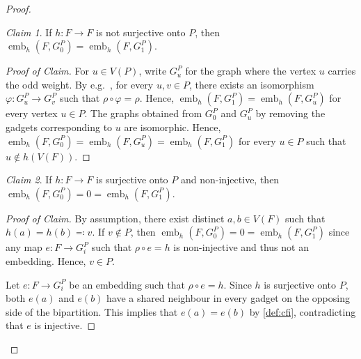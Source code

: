 \documentclass[11pt, DIV=15]{scrarticle}
\theoremstyle{definition}
\theoremstyle{plain}
\theoremstyle{remark}
\newtheorem{claim}{Claim}[definition]
\newenvironment{claimproof}[1][Proof of Claim]{\begin{proof}[#1] \renewcommand{\qedsymbol}{$\lrcorner$}}{ \end{proof}}
\DeclareMathOperator{\emb}{emb}
\renewcommand{\phi}{\varphi}
\begin{document}
\begin{proof}
		\begin{claim}\label{cl:knn1}
			If $h \colon F\to F$ is not surjective onto $P$,
			then $\emb_h(F, G_0^P) = \emb_h(F, G_1^P)$.
		\end{claim}
		\begin{claimproof}
			For $u \in V(P)$, write $G_u^P$ for the  graph where the vertex $u$ carries the odd weight.
			By e.g.\ \cite[Lemma~11]{neuen_homomorphism-distinguishing_2024}, for every $u, v \in P$, there exists an isomorphism $\phi \colon G_u^P \to G_v^P$ such that $\rho \circ \phi = \rho$.
			Hence, $\emb_h(F, G_1^P) = \emb_h(F, G_u^P)$ for every vertex $u \in P$.
			The graphs obtained from $G_0^P$ and $G_u^P$ by removing the gadgets corresponding to $u$ are isomorphic.
			Hence,
			$\emb_h(F, G_0^P) = \emb_h(F, G_u^P) = \emb_h(F, G_1^P)$ for every $u \in P$ such that $u \not\in h(V(F))$.
		\end{claimproof}
		
		\begin{claim}\label{cl:knn2}
			If $h \colon F \to F$ is surjective onto $P$
			and non-injective,
			then $\emb_h(F, G^P_0) = 0 = \emb_h(F, G^P_1)$.
		\end{claim}
		\begin{claimproof}
			By assumption, there exist distinct $a, b \in V(F)$ such that $h(a) = h(b) \eqqcolon v$.
			If $v \not\in P$,
			then $\emb_h(F, G_0^P) = 0 = \emb_h(F, G_1^P)$ since any map $e \colon F \to G_i^P$ such that $\rho \circ e = h$ is non-injective and thus not an embedding.
			Hence, $v \in P$.

			Let $e \colon F \to G_i^P$ be an embedding such that $\rho \circ e = h$.
			Since $h$ is surjective onto $P$,
			both $e(a)$ and $e(b)$ have a shared neighbour in every  gadget on the opposing side of the bipartition.
			This implies that $e(a) = e(b)$ by \cref{def:cfi},
			contradicting that $e$ is injective. 
		\end{claimproof}
		

\end{proof}
\end{document}
